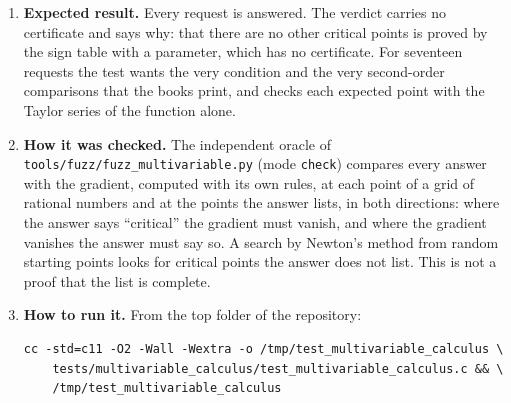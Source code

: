 \documentclass[11pt,a4paper]{article}
\begin{document}
\begin{enumerate}
\item \textbf{Expected result.} Every request is answered. The verdict carries no certificate and says why: that there are no other critical points is proved by the sign table with a parameter, which has no certificate. For seventeen requests the test wants the very condition and the very second-order comparisons that the books print, and checks each expected point with the Taylor series of the function alone.

\item \textbf{How it was checked.} The independent oracle of \texttt{tools/fuzz/fuzz\_multivariable.py} (mode \texttt{check}) compares every answer with the gradient, computed with its own rules, at each point of a grid of rational numbers and at the points the answer lists, in both directions: where the answer says ``critical'' the gradient must vanish, and where the gradient vanishes the answer must say so. A search by Newton's method from random starting points looks for critical points the answer does not list. This is not a proof that the list is complete.

\item \textbf{How to run it.} From the top folder of the repository:
\begin{verbatim}
cc -std=c11 -O2 -Wall -Wextra -o /tmp/test_multivariable_calculus \
    tests/multivariable_calculus/test_multivariable_calculus.c && \
    /tmp/test_multivariable_calculus
\end{verbatim}
\end{enumerate}
\end{document}
